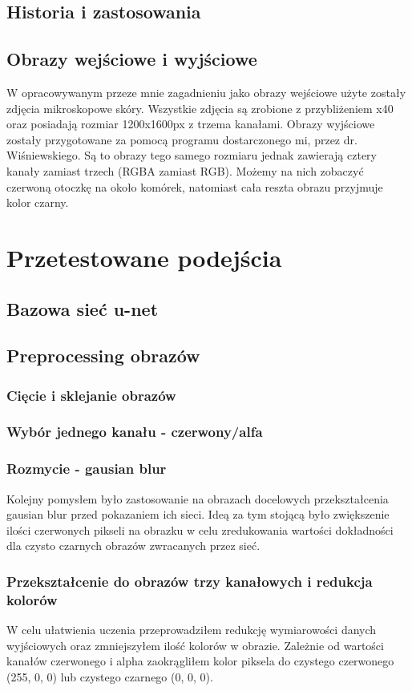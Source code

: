 \documentclass{article}
\begin{document}
\subsection{Historia i zastosowania}
\subsection{Obrazy wejściowe i wyjściowe}
W opracowywanym przeze mnie zagadnieniu jako obrazy wejściowe użyte zostały zdjęcia mikroskopowe skóry.
Wszystkie zdjęcia są zrobione z przybliżeniem x40 oraz posiadają rozmiar 1200x1600px z trzema kanałami.
Obrazy wyjściowe zostały przygotowane za pomocą programu dostarczonego mi, przez dr. Wiśniewskiego.
Są to obrazy tego samego rozmiaru jednak zawierają cztery kanały zamiast trzech (RGBA zamiast RGB).
Możemy na nich zobaczyć czerwoną otoczkę na około komórek, natomiast cała reszta obrazu przyjmuje kolor czarny.
\newpage
\section{Przetestowane podejścia}
\subsection{Bazowa sieć u-net}
\subsection{Preprocessing obrazów}
\subsubsection{Cięcie i sklejanie obrazów}
\subsubsection{Wybór jednego kanału - czerwony/alfa}
\subsubsection{Rozmycie - gausian blur}
Kolejny pomysłem było zastosowanie na obrazach docelowych przekształcenia gausian blur przed pokazaniem ich sieci.
Ideą za tym stojącą było zwiększenie ilości czerwonych pikseli na obrazku w celu zredukowania wartości dokładności dla czysto czarnych obrazów zwracanych przez sieć.
\subsubsection{Przekształcenie do obrazów trzy kanałowych i redukcja kolorów}
W celu ułatwienia uczenia przeprowadziłem redukcję wymiarowości danych wyjściowych oraz zmniejszyłem ilość kolorów w obrazie.
Zależnie od wartości kanałów czerwonego i alpha zaokrągliłem kolor piksela do czystego czerwonego (255, 0, 0) lub czystego czarnego (0, 0, 0).
\end{document}
